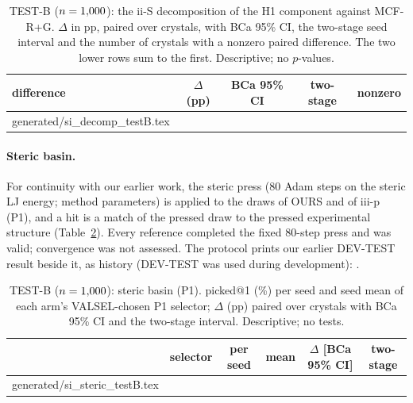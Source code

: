 \documentclass[journal=acsodf,manuscript=article]{achemso}
\makeatletter
\newcommand{\inputrows}[1]{\@@input #1 }
\makeatother
\begin{document}
\begin{table}[htbp]
\caption{TEST-B ($n=1{,}000$): the ii-S decomposition of the H1 component against MCF-R+G.
$\Delta$ in pp, paired over crystals, with BCa 95\% CI, the two-stage seed interval and the
number of crystals with a nonzero paired difference. The two lower rows sum to the first.
Descriptive; no $p$-values.}
\label{tab:si_decomp}
\centering
\small
\begin{tabular}{@{}p{5.6cm}cccc@{}}
\toprule
difference & $\Delta$ (pp) & BCa 95\% CI & two-stage & nonzero \\
\midrule
\inputrows{generated/si_decomp_testB.tex}
\bottomrule
\end{tabular}
\end{table}

\paragraph{Steric basin.} For continuity with our earlier work, the steric press (80 Adam steps
on the steric LJ energy; method parameters) is applied to the draws of OURS and of iii-p (P1),
and a hit is a match of the pressed draw to the pressed experimental structure
(Table~\ref{tab:si_steric}). Every reference completed the fixed 80-step press and was valid;
convergence was not assessed. The protocol prints our earlier DEV-TEST result beside it, as
history (DEV-TEST was used during development): \svGtwoContext.

\begin{table}[htbp]
\caption{TEST-B ($n=1{,}000$): steric basin (P1). picked@1 (\%) per seed and seed mean of each
arm's VALSEL-chosen P1 selector; $\Delta$ (pp) paired over crystals with BCa 95\% CI and the
two-stage interval. Descriptive; no tests.}
\label{tab:si_steric}
\centering
\footnotesize
\begin{tabular}{@{}p{3.4cm}lcccc@{}}
\toprule
 & selector & per seed & mean & $\Delta$ [BCa 95\% CI] & two-stage \\
\midrule
\inputrows{generated/si_steric_testB.tex}
\bottomrule
\end{tabular}
\end{table}
\end{document}
